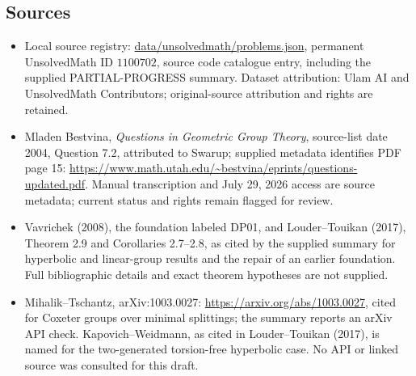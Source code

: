 \documentclass[11pt]{article}
\begin{document}
\subsection{Sources}
\begin{itemize}
\item Local source registry: \url{data/unsolvedmath/problems.json}, permanent UnsolvedMath ID $1100702$, source code catalogue entry, including the supplied PARTIAL-PROGRESS summary. Dataset attribution: Ulam AI and UnsolvedMath Contributors; original-source attribution and rights are retained.
\item Mladen Bestvina, \emph{Questions in Geometric Group Theory}, source-list date 2004, Question 7.2, attributed to Swarup; supplied metadata identifies PDF page 15: \url{https://www.math.utah.edu/~bestvina/eprints/questions-updated.pdf}. Manual transcription and July 29, 2026 access are source metadata; current status and rights remain flagged for review.
\item Vavrichek (2008), the foundation labeled DP01, and Louder--Touikan (2017), Theorem 2.9 and Corollaries 2.7--2.8, as cited by the supplied summary for hyperbolic and linear-group results and the repair of an earlier foundation. Full bibliographic details and exact theorem hypotheses are not supplied.
\item Mihalik--Tschantz, arXiv:1003.0027: \url{https://arxiv.org/abs/1003.0027}, cited for Coxeter groups over minimal splittings; the summary reports an arXiv API check. Kapovich--Weidmann, as cited in Louder--Touikan (2017), is named for the two-generated torsion-free hyperbolic case. No API or linked source was consulted for this draft.
\end{itemize}
\end{document}
